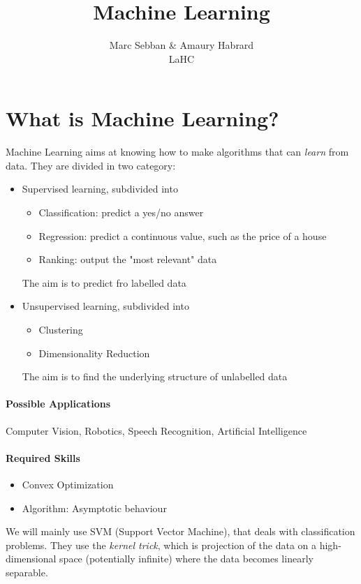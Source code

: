 \documentclass{article}
\title{Machine Learning}
\author{Marc Sebban \& Amaury Habrard\\
\small LaHC}
\date{}
\begin{document}
\maketitle
\tableofcontents
\newpage



\section{What is Machine Learning?}
Machine Learning aims at knowing how to make algorithms that can \emph{learn} from data. They are divided in two category:
\begin{itemize}
\item Supervised learning, subdivided into 
\begin{itemize}
\item Classification: predict a yes/no answer
\item Regression: predict a continuous value, such as the price of a house
\item Ranking: output the "most relevant" data
\end{itemize}
The aim is to predict fro labelled data
\item Unsupervised learning, subdivided into 
\begin{itemize}
\item Clustering
\item Dimensionality Reduction
\end{itemize}
The aim is to find the underlying structure of unlabelled data
\end{itemize}

\paragraph{Possible Applications}
Computer Vision, Robotics, Speech Recognition, Artificial Intelligence

\paragraph{Required Skills}
\begin{itemize}
\item Convex Optimization
\item Algorithm: Asymptotic behaviour
\end{itemize}

We will mainly use SVM (Support Vector Machine), that deals with classification problems. They use the \emph{kernel trick}, which is projection of the data on a high-dimensional space (potentially infinite) where the data becomes linearly separable.
\end{document}
